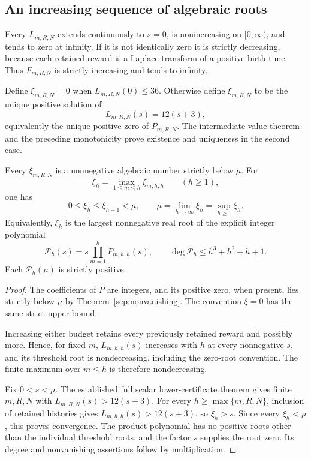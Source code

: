 \subsection{An increasing sequence of algebraic roots}

Every $L_{m,R,N}$ extends continuously to $s=0$, is nonincreasing on
$[0,\infty)$, and tends to zero at infinity. If it is not identically
zero it is strictly decreasing, because each retained reward is a
Laplace transform of a positive birth time. Thus $F_{m,R,N}$ is
strictly increasing and tends to infinity.

Define $\xi_{m,R,N}=0$ when $L_{m,R,N}(0)\le36$. Otherwise define
$\xi_{m,R,N}$ to be the unique positive solution of
\[
 L_{m,R,N}(s)=12(s+3),
\]
equivalently the unique positive zero of $P_{m,R,N}$.
The intermediate value theorem and the preceding monotonicity prove
existence and uniqueness in the second case.

\begin{theorem}\label{scp:roots}
Every $\xi_{m,R,N}$ is a nonnegative algebraic number strictly below
$\mu$. For
\[
 \xi_h=\max_{1\le m\le h}\xi_{m,h,h}\qquad(h\ge1),
\]
one has
\[
 0\le\xi_h\le\xi_{h+1}<\mu,
 \qquad \boxed{\mu=\lim_{h\to\infty}\xi_h=\sup_{h\ge1}\xi_h.}
\]
Equivalently, $\xi_h$ is the largest nonnegative real root of the
explicit integer polynomial
\[
 \mathcal P_h(s)=s\prod_{m=1}^h P_{m,h,h}(s),
 \qquad \deg\mathcal P_h\le h^3+h^2+h+1.
\]
Each $\mathcal P_h(\mu)$ is strictly positive.
\end{theorem}
\begin{proof}
The coefficients of $P$ are integers, and its positive zero, when
present, lies strictly below $\mu$ by Theorem~\ref{scp:nonvanishing}.
The convention $\xi=0$ has the same strict upper bound.

Increasing either budget retains every previously retained reward and
possibly more. Hence, for fixed $m$, $L_{m,h,h}(s)$ increases with $h$
at every nonnegative $s$, and its threshold root is nondecreasing,
including the zero-root convention. The finite maximum over $m\le h$
is therefore nondecreasing.

Fix $0<s<\mu$. The established full scalar lower-certificate theorem
gives finite $m,R,N$ with $L_{m,R,N}(s)>12(s+3)$. For every
$h\ge\max\{m,R,N\}$, inclusion of retained histories gives
$L_{m,h,h}(s)>12(s+3)$, so $\xi_h>s$. Since every $\xi_h<\mu$,
this proves convergence. The product polynomial has no positive roots
other than the individual threshold roots, and the factor $s$ supplies
the root zero. Its degree and nonvanishing assertions follow by
multiplication.
\end{proof}

